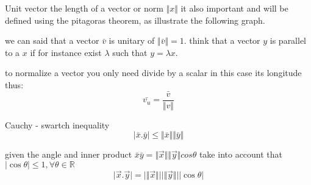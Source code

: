 \documentclass{beamer}
\begin{document}
\begin{frame}{Unit vector}
the length of a vector or norm $\Vert x \Vert $ it also important and will be defined using 
the pitagoras theorem, as illustrate the following graph.

we can said that a vector $\bar{v}$ is unitary of $ \Vert \bar{v} \Vert = 1$.
think that a vector $y$ is parallel to a $x$ if for instance exist $\lambda$ such that 
$y = \lambda x $. 


to normalize a vector you only need divide by a scalar in this case its longitude thus:
\begin{equation}
\bar{v_{u}} = \frac{\bar{v}}{\Vert  v \Vert} 
\end{equation}
\end{frame}


\begin{frame}{	Cauchy - swartch inequality}
\begin{equation}
\vert \bar{x} . \bar{y} \vert \leq \Vert \bar{x} \Vert \Vert \bar{y} \Vert
\end{equation}

given the angle and inner product $\bar{x}\bar{y} = \Vert \vec{x} \Vert \Vert \vec{y} \Vert cos \theta$ take into account that $\vert\cos \theta \vert \leq 1 , \forall \theta \in \mathbb{R}$
\begin{equation}
\vert \vec{x} . \vec{y} \vert = \vert \Vert \vec{x} \Vert \vert  \vert \Vert \vec{y} \Vert \vert \vert \cos \theta  \vert
\end{equation}
\end{frame} 
\end{document}

